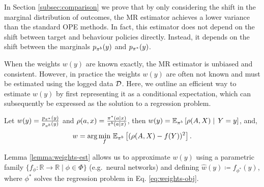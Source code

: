 In Section \ref{subsec:comparison} we prove that by only considering the shift in the marginal distribution of outcomes, the MR estimator achieves a lower variance than the standard OPE methods. In fact, this estimator does not depend on the shift between target and behaviour policies directly. Instead, it depends on the shift between the marginals $p_{\pi^b}(y)$ and $p_{\pi^*}(y)$.

 When the weights $w(y)$ are known exactly, the MR estimator is unbiased and consistent. However, in practice the weights $w(y)$ are often not known and must be estimated using the logged data $\mathcal{D}$. Here, we outline an efficient way to estimate $w(y)$ by first representing it as a conditional expectation, which can subsequently be expressed as the solution to a regression problem.
\begin{lemma}\label{lemma:weights-est}
Let $w(y)=\frac{p_{\pi^*}(y)}{p_{\pi^b}(y)}$ and $\rho(a, x) = \frac{\pi^*(a\mid x)}{\pi^b(a\mid x)}$, then $w(y) = \mathbb{E}_{\pi^b}\left[ \rho(A, X) \mid \,Y=y \right]$, and,
\begin{align}
 w = \arg\min_{f} \, \mathbb{E}_{\pi^b} \left[(\rho(A, X)-f(Y))^2\right]. \label{eq:weights-obj}
\end{align}
\end{lemma}
Lemma \ref{lemma:weights-est} allows us to approximate $w(y)$ using a parametric family $\{f_\phi: \mathbb{R}\rightarrow \mathbb{R} \mid \phi \in \Phi\}$ (e.g.\ neural networks) and defining $\hat{w}(y)\coloneqq f_{\phi^*}(y)$, where $\phi^*$ solves the regression problem in Eq. \eqref{eq:weights-obj}. 


